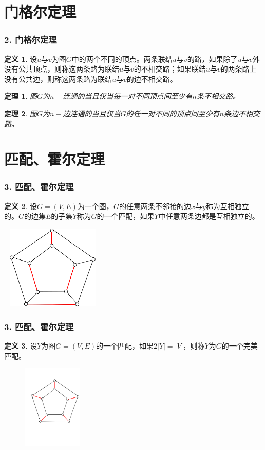 \documentclass{beamer}
\newtheorem{Thm}{定理}[section]
\theoremstyle{definition}
\newtheorem{Def}{定义}[section]
\theoremstyle{example}
\begin{document}
\begin{CJK}{UTF8}{gbsn}
\section{门格尔定理}

\begin{frame}
  \frametitle{2. 门格尔定理}
    \begin{Def}
    设$u$与$v$为图$G$中的两个不同的顶点。两条联结$u$与$v$的路，如果除了$u$与$v$外没有公共顶点，则称这两条路为联结$u$与$v$的\alert{不相交路}；如果联结$u$与$v$的两条路上没有公共边，则称这两条路为联结$u$与$v$的\alert{边不相交路}。
  \end{Def}
  \begin{Thm}
    图$G$为$n-$连通的当且仅当每一对不同顶点间至少有$n$条不相交路。
  \end{Thm}
  \begin{Thm}
    图$G$为$n-$边连通的当且仅当$G$的任一对不同的顶点间至少有$n$条边不相交路。
  \end{Thm}
\end{frame}
\section{匹配、霍尔定理}
\begin{frame}
  \frametitle{3. 匹配、霍尔定理}

  \begin{Def}
    设$G=(V,E)$为一个图，$G$的任意两条不邻接的边$x$与$y$称为互相\alert{独立}的。$G$的边集$E$的子集$Y$称为$G$的一个\alert{匹配}，如果$Y$中任意两条边都是互相独立的。
  \end{Def}
\pause
\centering
\includegraphics[width=5cm,height=4cm]{matching}
\end{frame}
\begin{frame}
  \frametitle{3. 匹配、霍尔定理}
  \begin{Def}
    设$Y$为图$G=(V,E)$的一个匹配，如果$2|Y|=|V|$，则称$Y$为$G$的一个\alert{完美匹配}。
  \end{Def}
\pause
\centering
\includegraphics[width=5cm,height=4cm]{perfect}
\end{frame}


\end{CJK}
\end{document}
